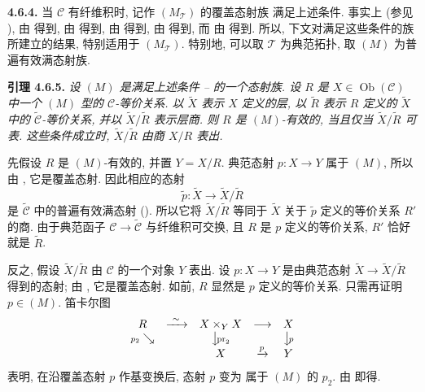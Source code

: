 \medskip
\noindent{}\textbf{4.6.4.}
当 \(\mathscr C\) 有纤维积时, 记作 \((M_{\mathcal T})\) 的覆盖态射族
满足上述条件. 事实上 (参见 ),
 由
 得到,
 由
 得到,
 由
 得到,
 由
 得到,
而  由
 得到.
所以, 下文对满足这些条件的族所建立的结果, 特别适用于
\((M_{\mathcal T})\). 特别地, 可以取 \(\mathcal T\) 为典范拓扑,
取 \((M)\) 为普遍有效满态射族.

\medskip
\noindent{}\textbf{引理 4.6.5.}
\textit{设 \((M)\) 是满足上述条件
--
的一个态射族.
设 \(R\) 是 \(X\in\operatorname{Ob}(\mathscr C)\) 中一个
\((M)\) 型的 \(\mathscr C\)-等价关系.
以 \(\widetilde X\) 表示 \(X\) 定义的层,
以 \(\widetilde R\) 表示 \(R\) 定义的 \(\widetilde X\) 中的
\(\widetilde{\mathscr C}\)-等价关系,
并以 \(\widetilde X/\widetilde R\) 表示层商.
则 \(R\) 是 \((M)\)-有效的, 当且仅当
\(\widetilde X/\widetilde R\) 可表.
这些条件成立时, \(\widetilde X/\widetilde R\) 由商 \(X/R\) 表出.}

先假设 \(R\) 是 \((M)\)-有效的, 并置 \(Y=X/R\).
典范态射 \(p:X\to Y\) 属于 \((M)\),
所以由 ,
它是覆盖态射. 因此相应的态射
\[
 \widetilde p:\widetilde X\longrightarrow
 \widetilde X/\widetilde R
\]
是 \(\widetilde{\mathscr C}\) 中的普遍有效满态射
().
所以它将 \(\widetilde X/\widetilde R\) 等同于 \(\widetilde X\)
关于 \(\widetilde p\) 定义的等价关系 \(R'\) 的商.
由于典范函子 \(\mathscr C\to\widetilde{\mathscr C}\) 与纤维积可交换,
且 \(R\) 是 \(p\) 定义的等价关系, \(R'\) 恰好就是 \(\widetilde R\).

反之, 假设 \(\widetilde X/\widetilde R\) 由
\(\mathscr C\) 的一个对象 \(Y\) 表出.
设 \(p:X\to Y\) 是由典范态射
\(\widetilde X\to\widetilde X/\widetilde R\) 得到的态射;
由 , 它是覆盖态射.
如前, \(R\) 显然是 \(p\) 定义的等价关系.
只需再证明 \(p\in(M)\). 笛卡尔图
\[
\begin{array}{ccccc}
 R&\xrightarrow{\ \sim\ }&X\times_YX&\longrightarrow&X\cr
 {\scriptstyle p_2}\searrow&&\big\downarrow\!{\scriptstyle\mathrm{pr}_2}
 &&\big\downarrow\!{\scriptstyle p}\cr
 &&X&\xrightarrow{p}&Y
\end{array}
\]
表明, 在沿覆盖态射 \(p\) 作基变换后, 态射 \(p\) 变为
属于 \((M)\) 的 \(p_2\).
由 
即得.

